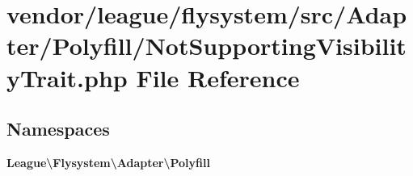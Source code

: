 \section{vendor/league/flysystem/src/\+Adapter/\+Polyfill/\+Not\+Supporting\+Visibility\+Trait.php File Reference}
\label{_not_supporting_visibility_trait_8php}
\subsection*{Namespaces}
\begin{DoxyCompactItemize}
\item 
 {\bf League\textbackslash{}\+Flysystem\textbackslash{}\+Adapter\textbackslash{}\+Polyfill}
\end{DoxyCompactItemize}
